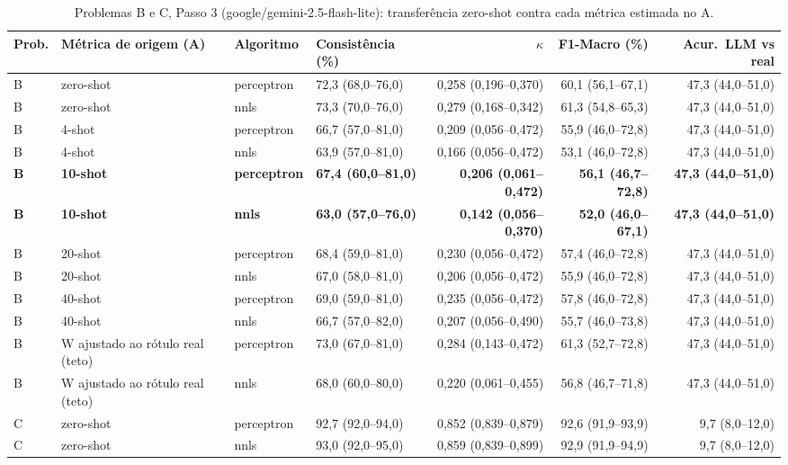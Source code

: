 \begin{table}[htbp]
\centering
\small
\caption{Problemas B e C, Passo 3 (google/gemini-2.5-flash-lite): transferência zero-shot contra cada métrica estimada no A.}
\label{tab:BC_passo3_todas_metricas_A_flashlite}
\begin{tabular}{llllrrr}
\toprule
Prob. & Métrica de origem (A) & Algoritmo & Consistência (\%) & $\kappa$ & F1-Macro (\%) & Acur.\ LLM vs real \\
\midrule
B & zero-shot & perceptron & 72,3 (68,0–76,0) & 0,258 (0,196–0,370) & 60,1 (56,1–67,1) & 47,3 (44,0–51,0) \\
B & zero-shot & nnls & 73,3 (70,0–76,0) & 0,279 (0,168–0,342) & 61,3 (54,8–65,3) & 47,3 (44,0–51,0) \\
B & 4-shot & perceptron & 66,7 (57,0–81,0) & 0,209 (0,056–0,472) & 55,9 (46,0–72,8) & 47,3 (44,0–51,0) \\
B & 4-shot & nnls & 63,9 (57,0–81,0) & 0,166 (0,056–0,472) & 53,1 (46,0–72,8) & 47,3 (44,0–51,0) \\
\textbf{B} & \textbf{10-shot} & \textbf{perceptron} & \textbf{67,4 (60,0–81,0)} & \textbf{0,206 (0,061–0,472)} & \textbf{56,1 (46,7–72,8)} & \textbf{47,3 (44,0–51,0)} \\
\textbf{B} & \textbf{10-shot} & \textbf{nnls} & \textbf{63,0 (57,0–76,0)} & \textbf{0,142 (0,056–0,370)} & \textbf{52,0 (46,0–67,1)} & \textbf{47,3 (44,0–51,0)} \\
B & 20-shot & perceptron & 68,4 (59,0–81,0) & 0,230 (0,056–0,472) & 57,4 (46,0–72,8) & 47,3 (44,0–51,0) \\
B & 20-shot & nnls & 67,0 (58,0–81,0) & 0,206 (0,056–0,472) & 55,9 (46,0–72,8) & 47,3 (44,0–51,0) \\
B & 40-shot & perceptron & 69,0 (59,0–81,0) & 0,235 (0,056–0,472) & 57,8 (46,0–72,8) & 47,3 (44,0–51,0) \\
B & 40-shot & nnls & 66,7 (57,0–82,0) & 0,207 (0,056–0,490) & 55,7 (46,0–73,8) & 47,3 (44,0–51,0) \\
B & W ajustado ao rótulo real (teto) & perceptron & 73,0 (67,0–81,0) & 0,284 (0,143–0,472) & 61,3 (52,7–72,8) & 47,3 (44,0–51,0) \\
B & W ajustado ao rótulo real (teto) & nnls & 68,0 (60,0–80,0) & 0,220 (0,061–0,455) & 56,8 (46,7–71,8) & 47,3 (44,0–51,0) \\
\midrule
C & zero-shot & perceptron & 92,7 (92,0–94,0) & 0,852 (0,839–0,879) & 92,6 (91,9–93,9) & 9,7 (8,0–12,0) \\
C & zero-shot & nnls & 93,0 (92,0–95,0) & 0,859 (0,839–0,899) & 92,9 (91,9–94,9) & 9,7 (8,0–12,0) \\

\end{tabular}
\end{table}
